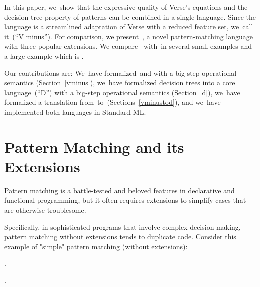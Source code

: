 \documentclass[article,screen,12pt, nonacm]{acmart}
\begin{document}

In this paper, we~show that the expressive quality of Verse's equations and
the decision-tree property of patterns can be combined in a single language.
Since the language is a streamlined adaptation of Verse with a reduced feature
set, we~call it~\VMinus (“V minus”). For comparison, we present~\PPlus, a novel
pattern-matching language with three popular extensions. We compare~\VMinus
with~\PPlus in several small examples and a large example which is \padlexample. 



Our contributions are: 
We~have formalized~\PPlus and \VMinus with a big-step operational semantics
(Section~\ref{vminus}), we~have formalized decision trees into a core
language~\D (“D”) with a big-step operational semantics (Section~\ref{d}), 
we~have formalized a translation from~\VMinus to~\D (Sections~\ref{vminustod}),
and we~have implemented both languages in Standard ML. 



\section{Pattern Matching and its Extensions}
\label{pmandextensions}
    \textbf{}


    Pattern matching is a battle-tested and beloved features in declarative and
    functional programming, but it often requires extensions to simplify cases
    that are otherwise troublesome. 
    
    
    Specifically, in sophisticated programs that involve complex
    decision-making, pattern matching without extensions tends to duplicate
    code. Consider this example of "simple" pattern matching (without
    extensions): 

    .

    . 
\end{document}
